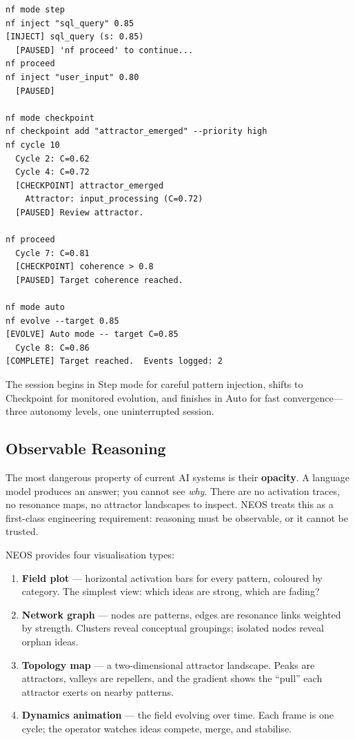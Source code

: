 \begin{terminalbox}
\begin{lstlisting}[style=neosshell]
nf mode step
nf inject "sql_query" 0.85
[INJECT] sql_query (s: 0.85)
  [PAUSED] 'nf proceed' to continue...
nf proceed
nf inject "user_input" 0.80
  [PAUSED]

nf mode checkpoint
nf checkpoint add "attractor_emerged" --priority high
nf cycle 10
  Cycle 2: C=0.62
  Cycle 4: C=0.72
  [CHECKPOINT] attractor_emerged
    Attractor: input_processing (C=0.72)
  [PAUSED] Review attractor.

nf proceed
  Cycle 7: C=0.81
  [CHECKPOINT] coherence > 0.8
  [PAUSED] Target coherence reached.

nf mode auto
nf evolve --target 0.85
[EVOLVE] Auto mode -- target C=0.85
  Cycle 8: C=0.86
[COMPLETE] Target reached.  Events logged: 2
\end{lstlisting}
\end{terminalbox}

\noindent
The session begins in Step mode for careful pattern injection, shifts to
Checkpoint for monitored evolution, and finishes in Auto for fast
convergence---three autonomy levels, one uninterrupted session.

\subsection{Observable Reasoning}\label{sec:observable}

The most dangerous property of current AI systems is their
\textbf{opacity}.  A language model produces an answer; you cannot see
\emph{why}.  There are no activation traces, no resonance maps, no
attractor landscapes to inspect.  NEOS treats this as a first-class
engineering requirement: reasoning must be observable, or it cannot be
trusted.

NEOS provides four visualisation types:
\begin{enumerate}[leftmargin=*]
\item \textbf{Field plot} --- horizontal activation bars for every
  pattern, coloured by category.  The simplest view: which ideas are
  strong, which are fading?
\item \textbf{Network graph} --- nodes are patterns, edges are
  resonance links weighted by strength.  Clusters reveal conceptual
  groupings; isolated nodes reveal orphan ideas.
\item \textbf{Topology map} --- a two-dimensional attractor landscape.
  Peaks are attractors, valleys are repellers, and the gradient shows
  the ``pull'' each attractor exerts on nearby patterns.
\item \textbf{Dynamics animation} --- the field evolving over time.
  Each frame is one cycle; the operator watches ideas compete, merge,
  and stabilise.
\end{enumerate}

